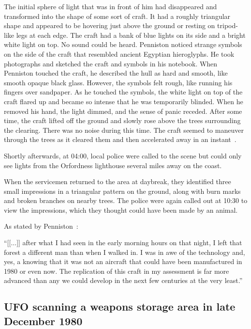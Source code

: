 The initial sphere of light that was in front of him had disappeared and transformed into the shape of some sort of craft.
It had a roughly triangular shape and appeared to be hovering just above the ground or resting on tripod-like legs at each edge.
The craft had a bank of blue lights on its side and a bright white light on top. No sound could be heard.
Penniston noticed strange symbols on the side of the craft that resembled ancient Egyptian hieroglyphs. He took photographs and sketched the craft and symbols in his notebook. When Penniston touched the craft, he described the hull as hard and smooth, like smooth opaque black glass. However, the symbols felt rough, like running his fingers over sandpaper. As he touched the symbols, the white light on top of the craft flared up and became so intense that he was temporarily blinded. When he removed his hand, the light dimmed, and the sense of panic receded. After some time, the craft lifted off the ground and slowly rose above the trees surrounding the clearing. There was no noise during this time.
The craft seemed to maneuver through the trees as it cleared them and then accelerated away in an instant~\cite[Chapter~1]{Pope2014Apr}.


Shortly afterwards, at 04:00, local police were called to the scene but could only see lights from the Orfordness lighthouse
several miles away on the coast.

When the servicemen returned to the area at daybreak,
they identified three small impressions in a triangular pattern on the ground,
along with burn marks and broken branches on nearby trees.
The police were again called out at 10:30 to view the impressions, which they thought could have been made by an animal.


As stated by Penniston~\cite[Chapter~19]{Pope2014Apr}:
\begin{svgraybox}
``[[$\ldots$]] after what I had seen in the early morning hours on that night, I left that forest a different man than when I walked in. I was in awe of the technology and, yes, a knowing that it was not an aircraft that could have been manufactured in 1980 or even now.
The replication of this craft in my assessment is far more advanced than any we could develop in the next few centuries at the very least.''
\end{svgraybox}


\subsection{UFO scanning a weapons storage area in late December 1980}

